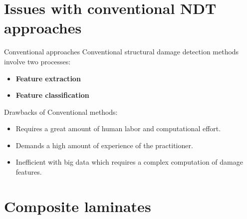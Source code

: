 \documentclass[10pt,aspectratio=169]{beamer} %
\begin{document}
\section{Issues with conventional NDT approaches}
\begin{frame}{Conventional approaches}
	Conventional structural damage detection methods involve two processes:
	\begin{itemize}
		\item \textbf{Feature extraction}
		\item \textbf{Feature classification}
	\end{itemize}
		Drawbacks of Conventional methods:
	\begin{itemize}
		\item Requires a great amount of human labor and computational effort.
		\item Demands a high amount of experience of the practitioner.
		\item Inefficient with big data which requires a complex computation of damage features. 
		\end{itemize}
\end{frame}
\section{Composite laminates}
\end{document}
